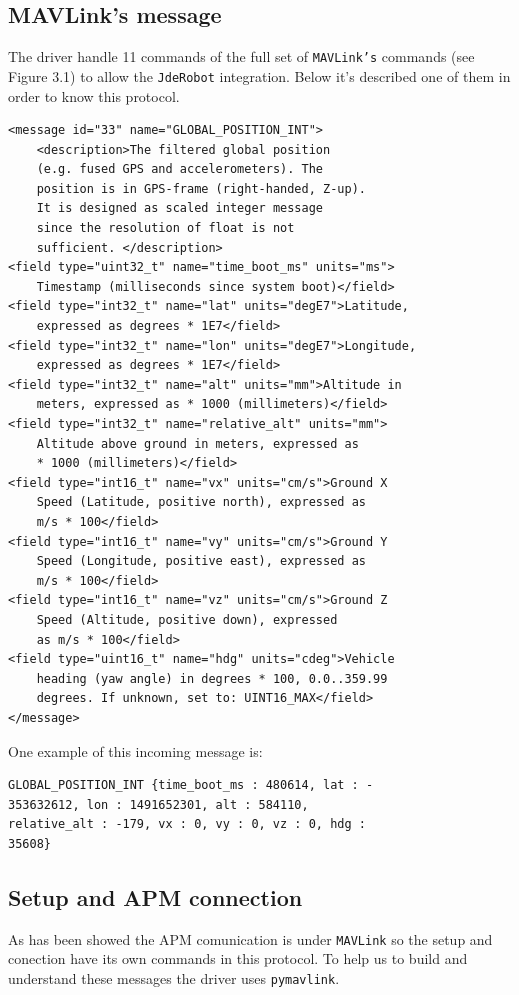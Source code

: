\subsection{MAVLink's message}

The driver handle 11 commands of the full set of \texttt{MAVLink's} commands (see Figure 3.1) to allow the \texttt{JdeRobot} integration. Below it's described one of them in order to know this protocol.

\begin{verbatim}
<message id="33" name="GLOBAL_POSITION_INT">
	<description>The filtered global position 
	(e.g. fused GPS and accelerometers). The 
	position is in GPS-frame (right-handed, Z-up).
	It is designed as scaled integer message 
	since the resolution of float is not 
	sufficient.	</description>
<field type="uint32_t" name="time_boot_ms" units="ms">
	Timestamp (milliseconds since system boot)</field>
<field type="int32_t" name="lat" units="degE7">Latitude, 
	expressed as degrees * 1E7</field>
<field type="int32_t" name="lon" units="degE7">Longitude, 
	expressed as degrees * 1E7</field>
<field type="int32_t" name="alt" units="mm">Altitude in 
	meters, expressed as * 1000 (millimeters)</field>
<field type="int32_t" name="relative_alt" units="mm">
	Altitude above ground in meters, expressed as 
	* 1000 (millimeters)</field>
<field type="int16_t" name="vx" units="cm/s">Ground X 
	Speed (Latitude, positive north), expressed as 
	m/s * 100</field>
<field type="int16_t" name="vy" units="cm/s">Ground Y 
	Speed (Longitude, positive east), expressed as 
	m/s * 100</field>
<field type="int16_t" name="vz" units="cm/s">Ground Z 
	Speed (Altitude, positive down), expressed 
	as m/s * 100</field>
<field type="uint16_t" name="hdg" units="cdeg">Vehicle 
	heading (yaw angle) in degrees * 100, 0.0..359.99 
	degrees. If unknown, set to: UINT16_MAX</field>
</message>
\end{verbatim}

One example of this incoming message is:
\begin{verbatim}
GLOBAL_POSITION_INT {time_boot_ms : 480614, lat : -
353632612, lon : 1491652301, alt : 584110, 
relative_alt : -179, vx : 0, vy : 0, vz : 0, hdg : 
35608}
\end{verbatim}

\subsection{Setup and APM connection}

As has been showed the APM comunication is under \texttt{MAVLink} so the setup and conection have its own commands in this protocol.
To help us to build and understand these messages the driver uses \texttt{pymavlink}.

